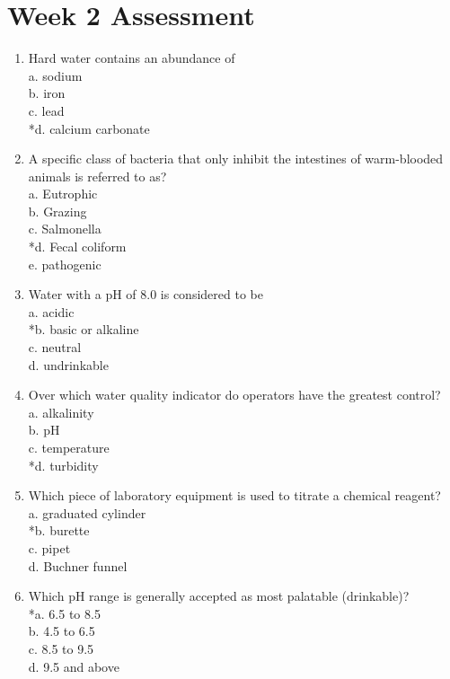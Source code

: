 \newpage
\section{Week 2 Assessment}
\begin{enumerate}[1.]

\item Hard water contains an abundance of\\
a. sodium\\
b. iron\\
c. lead\\
*d. calcium carbonate\\
\item A specific class of bacteria that only inhibit the intestines of warm-blooded animals is referred to as?\\
a. Eutrophic\\
b. Grazing\\
c. Salmonella\\
*d. Fecal coliform\\
e. pathogenic\\
\item Water with a pH of 8.0 is considered to be\\
a. acidic\\
*b. basic or alkaline\\
c. neutral\\
d. undrinkable\\
\item Over which water quality indicator do operators have the greatest control?\\
a. alkalinity\\
b. pH\\
c. temperature\\
*d. turbidity\\
\item Which piece of laboratory equipment is used to titrate a chemical reagent?\\
a. graduated cylinder\\
*b. burette\\
c. pipet\\
d. Buchner funnel\\
\item Which pH range is generally accepted as most palatable (drinkable)?\\
*a. 6.5 to 8.5\\
b. 4.5 to 6.5\\
c. 8.5 to 9.5\\
d. 9.5 and above\\

\end{enumerate}
